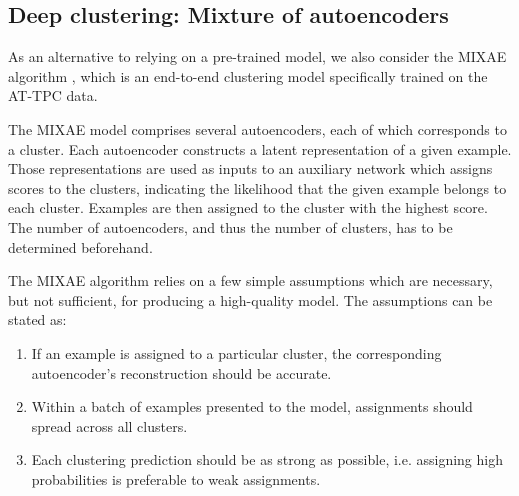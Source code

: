\documentclass[preprint,12pt]{elsarticle}
\newcommand{\R}{\mathbb{R}}
\begin{document}


\subsection{Deep clustering: Mixture of autoencoders}\label{sec:mixae}

As an alternative to relying on a pre-trained model, we also consider the MIXAE algorithm \cite{Zhang}, which is an end-to-end clustering model specifically trained on the AT-TPC data.

The MIXAE model comprises several autoencoders, each of which corresponds to a cluster.  Each autoencoder constructs a latent representation of a given example. Those representations are used as inputs to an auxiliary network which assigns scores to the clusters, indicating the likelihood that the given example belongs to each cluster. Examples are then assigned to the cluster with the highest score.  
The number of autoencoders, and thus the number of clusters, has to be determined beforehand.

The MIXAE algorithm relies on a few simple assumptions which are necessary, but not sufficient, for producing a high-quality model. The assumptions can be stated as: 
\begin{enumerate}
	\item  If an example is assigned to a particular cluster, the corresponding autoencoder's reconstruction should be accurate. 
	\item Within a batch of examples presented to the model, assignments should spread across all clusters. 
	\item Each clustering prediction should be as strong as possible, i.e. assigning high probabilities is preferable to weak assignments.
\end{enumerate}
\end{document}
